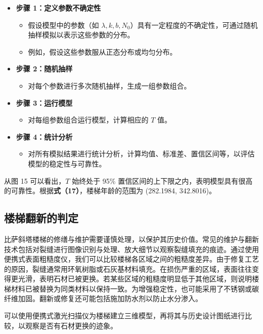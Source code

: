 \documentclass[11pt,a4paper]{ctexart}
\begin{document}
\begin{itemize}[leftmargin=2em,itemsep=2pt,topsep=2pt]
\item \textbf{步骤 1：定义参数不确定性}
\begin{itemize}[leftmargin=1.5em,itemsep=1pt,topsep=1pt]
\item 假设模型中的参数（如 $\lambda,k,b,N_0$）具有一定程度的不确定性，可通过随机抽样模拟以表示这些参数的分布。
\item 例如，假设这些参数服从正态分布或均匀分布。
\end{itemize}
\item \textbf{步骤 2：随机抽样}
\begin{itemize}[leftmargin=1.5em,itemsep=1pt,topsep=1pt]
\item 对每个参数进行多次随机抽样，生成一组参数组合。
\end{itemize}
\item \textbf{步骤 3：运行模型}
\begin{itemize}[leftmargin=1.5em,itemsep=1pt,topsep=1pt]
\item 对每组参数组合运行模型，计算相应的 $T$ 值。
\end{itemize}
\item \textbf{步骤 4：统计分析}
\begin{itemize}[leftmargin=1.5em,itemsep=1pt,topsep=1pt]
\item 对所有模拟结果进行统计分析，计算均值、标准差、置信区间等，以评估模型的稳定性与可靠性。
\end{itemize}
\end{itemize}

从图 15 可以看出，$T$ 始终处于 95\% 置信区间的上下限之内，表明模型具有很高的可靠性。根据\textbf{式（17）}，楼梯年龄的范围为 (282.1984, 342.8016)。

\subsection{楼梯翻新的判定}

比萨斜塔楼梯的修缮与维护需要谨慎处理，以保护其历史价值。常见的维护与翻新技术包括对裂缝进行图像识别与处理、放大细节以观察裂缝填充的痕迹。通过使用便携式表面粗糙度仪，我们可以比较楼梯各区域之间的粗糙度差异。由于修复工艺的原因，裂缝通常用环氧树脂或石灰基材料填充。在损伤严重的区域，表面往往变得更光滑，表明石材已被更换。若某些区域的粗糙度明显低于其他区域，则说明楼梯材料已被替换为同类材料以保持一致。为增强稳定性，也可能采用了不锈钢或碳纤维加固。翻新或修复还可能包括施加防水剂以防止水分渗入。

可以使用便携式激光扫描仪为楼梯建立三维模型，再将其与历史设计图纸进行比较，以观察是否有石材更换的迹象。
\end{document}
